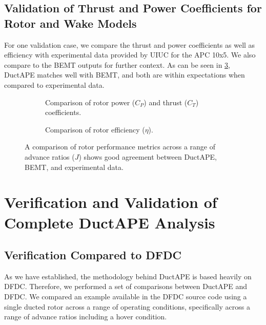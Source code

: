 \subsection{Validation of Thrust and Power Coefficients for Rotor and Wake Models}

For one validation case, we compare the thrust and power coefficients as well as efficiency with experimental data provided by UIUC for the APC 10x5.
%
We also compare to the BEMT outputs for further context.
%
As can be seen in \cref{fig:rotval1}, DuctAPE matches well with BEMT, and both are within expectations when compared to experimental data.

\begin{figure}[htb]
     \centering
     \begin{subfigure}[t]{0.45\textwidth}
        \centering
        
        \caption{Comparison of rotor power (\(C_P\)) and thrust (\(C_T\)) coefficients.}
        \label{}
     \end{subfigure}
     \hfill
     \begin{subfigure}[t]{0.45\textwidth}
         \centering
        
        \caption{Comparison of rotor efficiency (\(\eta\)).}
        \label{}
     \end{subfigure}
     \caption{A comparison of rotor performance metrics across a range of advance ratios (\(J\)) shows good agreement between DuctAPE, BEMT, and experimental data.}
    \label{fig:rotval1}
\end{figure}

\section{Verification and Validation of Complete DuctAPE Analysis}

\subsection{Verification Compared to DFDC}

As we have established, the methodology behind DuctAPE is based heavily on DFDC.
%
Therefore, we performed a set of comparisons between DuctAPE and DFDC.
%
We compared an example available in the DFDC source code using a single ducted rotor across a range of operating conditions, specifically across a range of advance ratios including a hover condition.

